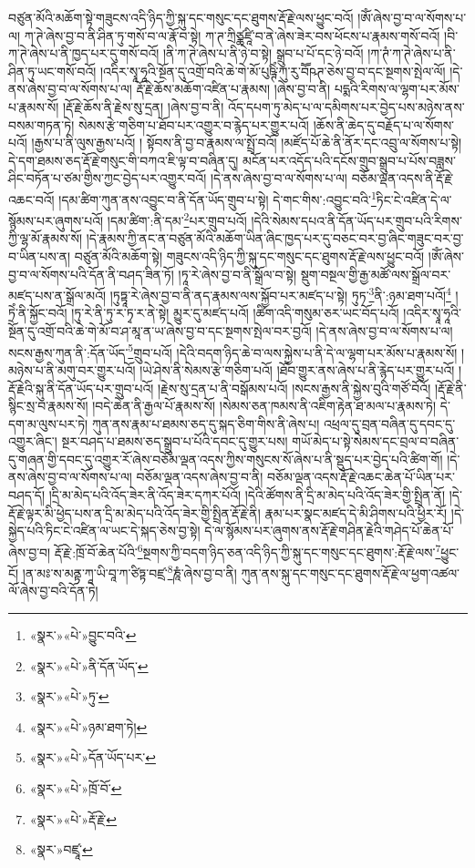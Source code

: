 བཙུན་མོའི་མཆོག་སྟེ་གཟུངས་འདི་ཉིད་ཀྱི་སྐུ་དང་གསུང་དང་ཐུགས་རྡོ་རྗེ་ལས་ཕྱུང་བའོ། །ཨོཾ་ཞེས་བྱ་བ་ལ་སོགས་པ་ལ། ཀ་ཊེ་ཞེས་བྱ་བ་ནི་ཤིན་ཏུ་གསོ་བ་ལ་རྣོ་བ་སྟེ། ཀ་ཊ་ཀྲིཙྪཛཱི་བ་ནེ་ཞེས་ཟེར་བས་ཕོངས་པ་རྣམས་གསོ་བའོ། །བི་ཀ་ཊེ་ཞེས་པ་ནི་ཁྱད་པར་དུ་གསོ་བའོ། །ནི་ཀ་ཊེ་ཞེས་པ་ནི་ཉེ་བ་སྟེ། སྒྲུབ་པ་པོ་དང་ཉེ་བའོ། །ཀ་ཊཾ་ཀ་ཊེ་ཞེས་པ་ནི་ཤིན་ཏུ་ཡང་གསོ་བའོ། །འདིར་སྭཱ་ཧཱའི་སྔོན་དུ་འགྲོ་བའི་ཆེ་གེ་མོ་པུཥྚིཾ་ཀུ་རུ་བཽཥཊ་ཅེས་བྱ་བ་དང་སྔགས་སྤེལ་ལོ། །དེ་ནས་ཞེས་བྱ་བ་ལ་སོགས་པ་ལ། རྡོ་རྗེ་ཆོས་མཆོག་འཛིན་པ་རྣམས། །ཞེས་བྱ་བ་ནི། པདྨའི་རིགས་ལ་ལྷག་པར་མོས་པ་རྣམས་སོ། །རྡོ་རྗེ་ཆོས་ནི་རྗེས་སུ་དྲན། །ཞེས་བྱ་བ་ནི། འོད་དཔག་ཏུ་མེད་པ་ལ་དམིགས་པར་བྱེད་པས་མཉེས་ནས་བསམ་གཏན་ཏེ། སེམས་རྩེ་གཅིག་པ་ཐོབ་པར་འགྱུར་བ་རྙེད་པར་གྱུར་པའོ། །ཆོས་ནི་ཆེད་དུ་བརྗོད་པ་ལ་སོགས་པའོ། །རྒྱས་པ་ནི་ལུས་རྒྱས་པའོ། །
སྟོབས་ནི་བྱ་བ་རྣམས་ལ་སྤྲོ་བའོ། །མཛོད་པོ་ཆེ་ནི་ནོར་དང་འབྲུ་ལ་སོགས་པ་སྟེ། དེ་དག་ཐམས་ཅད་རྡོ་རྗེ་གསུང་གི་བཀའ་ཇི་ལྟ་བ་བཞིན་དུ། མངོན་པར་འདོད་པའི་དངོས་གྲུབ་སྒྲུབ་པ་པོས་བཟླས་ཤིང་བཏོན་པ་ཙམ་གྱིས་ཀྱང་བྱེད་པར་འགྱུར་བའོ། །དེ་ནས་ཞེས་བྱ་བ་ལ་སོགས་པ་ལ། བཅོམ་ལྡན་འདས་ནི་རྡོ་རྗེ་འཆང་བའོ། །དམ་ཚིག་ཀུན་ནས་འབྱུང་བ་ནི་དོན་ཡོད་གྲུབ་པ་སྟེ། དེ་གང་གིས་:འབྱུང་བའི་\footnote{«སྣར་»«པེ་»བྱུང་བའི་}ཏིང་ངེ་འཛིན་དེ་ལ་སྙོམས་པར་ཞུགས་པའོ། །དམ་ཚིག་:ནི་དམ་\footnote{«སྣར་»«པེ་»ནི་དོན་ཡོད་}པར་གྲུབ་པའོ། །དེའི་སེམས་དཔའ་ནི་དོན་ཡོད་པར་གྲུབ་པའི་རིགས་ཀྱི་ལྷ་མོ་རྣམས་སོ། །དེ་རྣམས་ཀྱི་ནང་ན་བཙུན་མོའི་མཆོག་ཡིན་ཞིང་ཁྱད་པར་དུ་བཅང་བར་བྱ་ཞིང་གཟུང་བར་བྱ་བ་ཡིན་པས་ན། བཙུན་མོའི་མཆོག་སྟེ། གཟུངས་འདི་ཉིད་ཀྱི་སྐུ་དང་གསུང་དང་ཐུགས་རྡོ་རྗེ་ལས་ཕྱུང་བའོ། །ཨོཾ་ཞེས་བྱ་བ་ལ་སོགས་པའི་དོན་ནི་བཤད་ཟིན་ཏོ། །ཏཱ་རེ་ཞེས་བྱ་བ་ནི་སྒྲོལ་བ་སྟེ། སྡུག་བསྔལ་གྱི་རྒྱ་མཚོ་ལས་སྒྲོལ་བར་མཛད་པས་ན་སྒྲོལ་མའོ། །ཏུཏྟཱ་རེ་ཞེས་བྱ་བ་ནི་ནད་རྣམས་ལས་སྐྱོབ་པར་མཛད་པ་སྟེ། ཏུཏ་\footnote{«སྣར་»«པེ་»ཏུ་}ནི་:ཉམ་ཐག་པའོ།\footnote{«སྣར་»«པེ་»ཉམ་ཐག་ཏེ།} །ཏྲེཾ་ནི་སྐྱོང་བའོ། །ཏུ་རེ་ནི་ཏུ་ར་ཏྭ་ར་ནེ་སྟེ། མྱུར་དུ་མཛད་པའོ། །ཚིག་འདི་གསུམ་ཅར་ཡང་བོད་པའོ། །འདིར་སྭཱ་ཧཱའི་སྔོན་དུ་འགྲོ་བའི་ཆེ་གེ་མོ་བ་ཤ་མཱ་ན་ཡ་ཞེས་བྱ་བ་དང་སྔགས་སྤེལ་བར་བྱའོ། །དེ་ནས་ཞེས་བྱ་བ་ལ་སོགས་པ་ལ། སངས་རྒྱས་ཀུན་ནི་:དོན་ཡོད་\footnote{«སྣར་»«པེ་»དོན་ཡོད་པར་}གྲུབ་པའོ། །དེའི་བདག་ཉིད་ཆེ་བ་ལས་སྐྱེས་པ་ནི་དེ་ལ་ལྷག་པར་མོས་པ་རྣམས་སོ། །མཉེས་པ་ནི་མགུ་བར་གྱུར་པའོ། །ཡེ་ཤེས་ནི་སེམས་རྩེ་གཅིག་པའོ། །ཐོབ་གྱུར་ནས་ཞེས་པ་ནི་རྙེད་པར་གྱུར་པའོ། །རྡོ་རྗེའི་སྐུ་ནི་དོན་ཡོད་པར་གྲུབ་པའོ། །རྗེས་སུ་དྲན་པ་ནི་བསྒོམས་པའོ། །སངས་རྒྱས་ནི་སྐྱེས་བུའི་གཙོ་བོའོ། །རྡོ་རྗེ་ནི་སྙིང་སྲ་བ་རྣམས་སོ། །བདེ་ཆེན་ནི་རྒྱལ་པོ་རྣམས་སོ། །སེམས་ཅན་ཁམས་ནི་འཇིག་རྟེན་ཐ་མལ་པ་རྣམས་ཏེ། དེ་དག་མ་ལུས་པར་ཏེ། ཀུན་ནས་རྣམ་པ་ཐམས་ཅད་དུ་སྐད་ཅིག་གིས་ནི་ཞེས་པ། འཕྲལ་དུ་བྲན་བཞིན་དུ་དབང་དུ་འགྱུར་ཞིང་། སྔར་བཤད་པ་ཐམས་ཅད་སྒྲུབ་པ་པོའི་དབང་དུ་གྱུར་པས། གཡོ་མེད་པ་སྟེ་སེམས་དང་བྲལ་བ་བཞིན་དུ་གཞན་གྱི་དབང་དུ་འགྱུར་རོ་ཞེས་བཅོམ་ལྡན་འདས་ཀྱིས་གསུངས་སོ་ཞེས་པ་ནི་སྡུད་པར་བྱེད་པའི་ཚིག་གོ། །དེ་ནས་ཞེས་བྱ་བ་ལ་སོགས་པ་ལ། བཅོམ་ལྡན་འདས་ཞེས་བྱ་བ་ནི། བཅོམ་ལྡན་འདས་རྡོ་རྗེ་འཆང་ཆེན་པོ་ཡིན་པར་བཤད་དོ། །དྲི་མ་མེད་པའི་འོད་ཟེར་ནི་འོད་ཟེར་དཀར་པོའོ། །དེའི་ཚོགས་ནི་དྲི་མ་མེད་པའི་འོད་ཟེར་གྱི་སྤྲིན་ནོ། །དེ་རྡོ་རྗེ་ལྟར་མི་ཕྱེད་པས་ན་དྲི་མ་མེད་པའི་འོད་ཟེར་གྱི་སྤྲིན་རྡོ་རྗེ་ནི། རྣམ་པར་སྣང་མཛད་དེ་མི་ཤིགས་པའི་ཕྱིར་རོ། །དེ་སྐྱེད་པའི་ཏིང་ངེ་འཛིན་ལ་ཡང་དེ་སྐད་ཅེས་བྱ་སྟེ། དེ་ལ་སྙོམས་པར་ཞུགས་ནས་རྡོ་རྗེ་གཤིན་རྗེའི་གཤེད་པོ་ཆེན་པོ་ཞེས་བྱ་བ། རྡོ་རྗེ་:ཁྲོ་བོ་ཆེན་པོའི་\footnote{«སྣར་»«པེ་»ཁྲོ་བོ་}སྔགས་ཀྱི་བདག་ཉིད་ཅན་འདི་ཉིད་ཀྱི་སྐུ་དང་གསུང་དང་ཐུགས་:རྡོ་རྗེ་ལས་\footnote{«སྣར་»«པེ་»རྡོ་རྗེ་}ཕྱུང་ངོ། །ན་མཿ་ས་མནྟ་ཀཱ་ཡི་བཱ་ཀ་ཙིཏྟ་བཛྲ་\footnote{«སྣར་»བཛྲཱ་}ཎཱཾ་ཞེས་བྱ་བ་ནི། ཀུན་ནས་སྐུ་དང་གསུང་དང་ཐུགས་རྡོ་རྗེ་ལ་ཕྱག་འཚལ་ལོ་ཞེས་བྱ་བའི་དོན་ཏེ། 